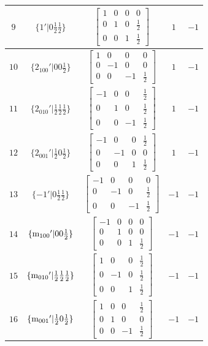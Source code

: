 \documentclass[fleqn,8pt]{jsarticle}
\begin{document}
\begin{longtable}{ccccc}
$ 9 $ & $ \{1{}'|0 \frac{1}{2} \frac{1}{2}\} $ & $ \begin{bmatrix} 1 & 0 & 0 & 0 \\ 0 & 1 & 0 & \frac{1}{2} \\ 0 & 0 & 1 & \frac{1}{2} \end{bmatrix} $ & $ 1 $ & $ -1 $ \\ \hline
$ 10 $ & $ \{2{}_{100}{}'|0 0 \frac{1}{2}\} $ & $ \begin{bmatrix} 1 & 0 & 0 & 0 \\ 0 & -1 & 0 & 0 \\ 0 & 0 & -1 & \frac{1}{2} \end{bmatrix} $ & $ 1 $ & $ -1 $ \\ \hline
$ 11 $ & $ \{2{}_{010}{}'|\frac{1}{2} \frac{1}{2} \frac{1}{2}\} $ & $ \begin{bmatrix} -1 & 0 & 0 & \frac{1}{2} \\ 0 & 1 & 0 & \frac{1}{2} \\ 0 & 0 & -1 & \frac{1}{2} \end{bmatrix} $ & $ 1 $ & $ -1 $ \\ \hline
$ 12 $ & $ \{2{}_{001}{}'|\frac{1}{2} 0 \frac{1}{2}\} $ & $ \begin{bmatrix} -1 & 0 & 0 & \frac{1}{2} \\ 0 & -1 & 0 & 0 \\ 0 & 0 & 1 & \frac{1}{2} \end{bmatrix} $ & $ 1 $ & $ -1 $ \\ \hline
$ 13 $ & $ \{-1{}'|0 \frac{1}{2} \frac{1}{2}\} $ & $ \begin{bmatrix} -1 & 0 & 0 & 0 \\ 0 & -1 & 0 & \frac{1}{2} \\ 0 & 0 & -1 & \frac{1}{2} \end{bmatrix} $ & $ -1 $ & $ -1 $ \\ \hline
$ 14 $ & $ \{{\rm m}_{100}{}'|0 0 \frac{1}{2}\} $ & $ \begin{bmatrix} -1 & 0 & 0 & 0 \\ 0 & 1 & 0 & 0 \\ 0 & 0 & 1 & \frac{1}{2} \end{bmatrix} $ & $ -1 $ & $ -1 $ \\ \hline
$ 15 $ & $ \{{\rm m}_{010}{}'|\frac{1}{2} \frac{1}{2} \frac{1}{2}\} $ & $ \begin{bmatrix} 1 & 0 & 0 & \frac{1}{2} \\ 0 & -1 & 0 & \frac{1}{2} \\ 0 & 0 & 1 & \frac{1}{2} \end{bmatrix} $ & $ -1 $ & $ -1 $ \\ \hline
$ 16 $ & $ \{{\rm m}_{001}{}'|\frac{1}{2} 0 \frac{1}{2}\} $ & $ \begin{bmatrix} 1 & 0 & 0 & \frac{1}{2} \\ 0 & 1 & 0 & 0 \\ 0 & 0 & -1 & \frac{1}{2} \end{bmatrix} $ & $ -1 $ & $ -1 $ \\
\end{longtable}
\end{document}
